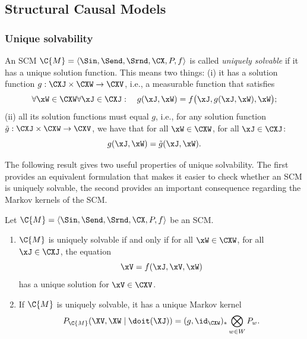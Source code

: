 \subsection{Structural Causal Models}

\subsubsection{Unique solvability}

\begin{Def}\label{def:scm_unique_solvability}
  An SCM $\C{M} = \langle \Sin, \Send, \Srnd, \CX, P, f \rangle$ is called \emph{uniquely solvable} if it has a unique solution function. This means two things: (i) it has a solution function $g : \CXJ \times \CXW \to \CXV$, i.e., a measurable function
  that satisfies
  $$\forall \xW\in\CXW \forall \xJ\in\CXJ: \quad g(\xJ,\xW) = f\big(\xJ, g(\xJ,\xW), \xW\big);$$
  (ii) all its solution functions must equal $g$, i.e., for any solution function $\tilde{g} : \CXJ \times \CXW \to \CXV$,
  we have that for all $\xW\in\CXW$, for all $\xJ\in\CXJ$:
  $$g(\xJ,\xW) = \tilde{g}(\xJ,\xW).$$
\end{Def}
The following result gives two useful properties of unique solvability. 
The first provides an equivalent formulation that makes it easier to check whether an SCM
is uniquely solvable, the second provides an important consequence regarding
the Markov kernels of the SCM.
\begin{Thm}\label{thm:scm_unique_solvability}
  Let $\C{M} = \langle \Sin, \Send, \Srnd, \CX, P, f \rangle$ be an SCM.
  \begin{enumerate}
    \item $\C{M}$ is uniquely solvable if and only if 
      for all $\xW\in\CXW$, for all $\xJ \in \CXJ$, the equation
      $$\xV = f(\xJ,\xV,\xW)$$
      has a unique solution for $\xV\in\CXV$.
    \item If $\C{M}$ is uniquely solvable, it has a unique Markov kernel 
      $$P_{\C{M}}(\XV,\XW \mid\doit(\XJ)) = (g,\id_{\CXW})_* \bigotimes_{w\in W} P_w.$$
  \end{enumerate}
\end{Thm}
